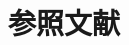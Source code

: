 ﻿\documentclass[uplatex]{jsarticle}
\begin{document}
\maketitlepage%
\tableofcontents%
\clearpage
{}
\setcounter{page}{1}


\section*{参照文献}
\begin{thebibliography}{9}
\bibitem{}
\end{thebibliography}

\clearpage
\clearpage
\makeokuzuke
\end{document}
